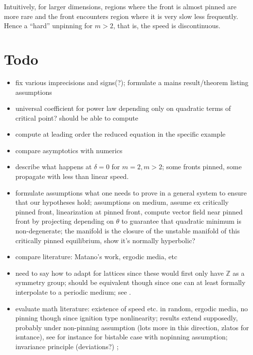 \documentclass[letterpaper,11pt]{article}
\newcommand{\Z}{\mathbb{Z}}
\numberwithin{equation}{section}
\theoremstyle{plain}
\begin{document}
Intuitively, for larger dimensions, regions where the front is almost pinned are more rare and the front encounters region where it is very slow less frequently. Hence a ``hard'' unpinning for $m>2$, that is, the speed is discontinuous. 


\section{Todo}


\begin{itemize}
\item fix various imprecisions and signs(?); formulate a mains result/theorem listing assumptions
\item universal coefficient for power law depending only on quadratic terms of critical point? should be able to compute
\item compute at leading order the reduced equation in the specific example
\item compare asymptotics with numerics
\item describe what happens at $\delta=0$ for $m=2,m>2$; some fronts pinned, some propagate with less than linear speed.
\item formulate assumptions what one needs to prove in a general system to ensure that our hypotheses hold; assumptions on medium, assume ex critically pinned front, linearization at pinned front, compute vector field near pinned front by projecting depending on $\theta$ to guarantee that quadratic minimum is non-degenerate; the manifold is the closure of the unstable manifold of this critically pinned equilibrium, show it's normally hyperbolic?
\item compare literature: Matano's work, ergodic media, etc
\item need to say how to adapt for lattices since these would first only have $\Z$ as a symmetry group; should be equivalent though since one can at least formally interpolate to a periodic medium; see \cite{vVs}.
\item evaluate math literature: \cite{nolen2} existence of speed etc. in random, ergodic media, no pinning though since ignition type nonlinearity; results extend supposedly, probably under non-pinning assumption (lots more in this direction, zlatos for isntance), see for instance \cite{nopinning} for bistable case with nopinning assumption; invariance principle (deviations?) \cite{nolen}; \cite{matano}
\end{itemize}
\end{document}
